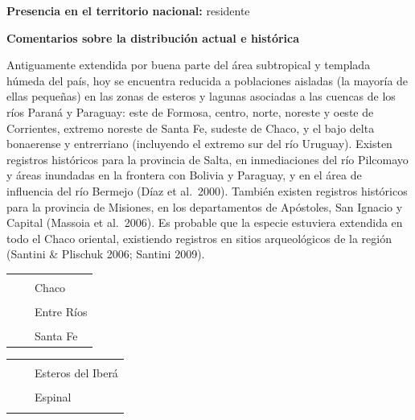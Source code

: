\documentclass[
  x11names]{article}
\begin{document}
\vspace{-0.4cm}

\textbf{Presencia en el territorio nacional:} residente

\textbf{Comentarios sobre la distribución actual e histórica}

Antiguamente extendida por buena parte del área subtropical y templada
húmeda del país, hoy se encuentra reducida a poblaciones aisladas (la
mayoría de ellas pequeñas) en las zonas de esteros y lagunas asociadas a
las cuencas de los ríos Paraná y Paraguay: este de Formosa, centro,
norte, noreste y oeste de Corrientes, extremo noreste de Santa Fe,
sudeste de Chaco, y el bajo delta bonaerense y entrerriano (incluyendo
el extremo sur del río Uruguay). Existen registros históricos para la
provincia de Salta, en inmediaciones del río Pilcomayo y áreas inundadas
en la frontera con Bolivia y Paraguay, y en el área de influencia del
río Bermejo (Díaz et al.~2000). También existen registros históricos
para la provincia de Misiones, en los departamentos de Apóstoles, San
Ignacio y Capital (Massoia et al.~2006). Es probable que la especie
estuviera extendida en todo el Chaco oriental, existiendo registros en
sitios arqueológicos de la región (Santini \& Plischuk 2006; Santini
2009).

\begin{tabu} to 
\toprule
\textbf{} &  & \\
\textbf{} &  & Chaco\\
\textbf{} &  & \\
\textbf{} &  & Entre Ríos\\
\textbf{} &  & \\
\textbf{} &  & Santa Fe\\
\bottomrule
\end{tabu}

\begin{tabu} to 
\toprule
\textbf{} &  & \\
\textbf{} &  & Esteros del Iberá\\
\textbf{} &  & \\
\textbf{} &  & Espinal\\
\textbf{} &  & \\
\bottomrule
\end{tabu}
\end{document}
